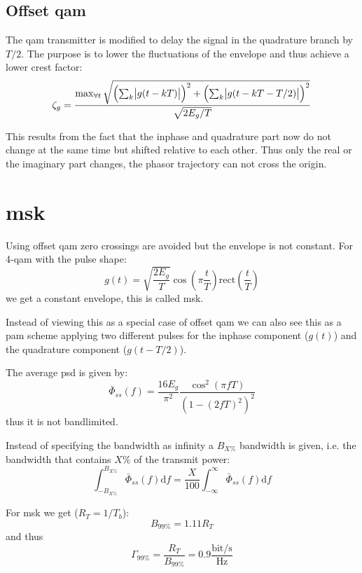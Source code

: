 \subsection{Offset \acl{qam}}
The \ac{qam} transmitter is modified to delay the signal in the quadrature branch
by $T/2$. The purpose is to lower the fluctuations of the envelope and thus achieve
a lower crest factor:
\begin{equation}
    \zeta_g = \frac{\max_{\forall t} \sqrt{{\left(\sum_k \abs{g(t-kT)}\right)}^2
        + {\left(\sum_k \abs{g(t-kT - T/2)}\right)}^2}}{\sqrt{2 E_g / T}}
\end{equation}

This results from the fact that the inphase and quadrature part now do not change
at the same time but shifted relative to each other. Thus only the real or the 
imaginary part changes, the phasor trajectory can not cross the origin.

\section{\acl{msk}}
Using offset \ac{qam} zero crossings are avoided but the envelope is not constant.
For 4-\ac{qam} with the pulse shape:
\begin{equation}
    g(t) = \sqrt{\frac{2 E_g}{T}} \cos\left(\pi \frac{t}{T}\right) 
        \text{rect}\left(\frac{t}{T}\right)
\end{equation}
we get a constant envelope, this is called \ac{msk}.

Instead of viewing this as a special case of offset \ac{qam} we can also see this as
a \ac{pam} scheme applying two different pulses for the inphase component ($g(t)$) and
the quadrature component ($g(t-T/2)$).

The average \ac{psd} is given by:
\begin{equation}
    \bar{\Phi}_{ss}(f) = \frac{16 E_g}{\pi^2} \frac{\cos^2(\pi f T)}{{(1-{(2fT)}^2)}^2}
\end{equation}
thus it is not bandlimited.

Instead of specifying the bandwidth as infinity a $B_{X\%}$ bandwidth is given,
i.e. the bandwidth that contains $X\%$ of the transmit power:
\begin{equation}
    \int_{-B_{X\%}}^{B_{X\%}} \bar{\Phi}_{ss}(f) \text{d}f =
        \frac{X}{100} \int_{-\infty}^\infty \bar{\Phi}_{ss}(f) \text{d}f
\end{equation}

For \ac{msk} we get ($R_T = 1/T_b$):
\begin{equation}
    B_{99\%} = 1.11 R_T
\end{equation}
and thus
\begin{equation}
    \Gamma_{99\%} = \frac{R_T}{B_{99\%}} = 0.9 \frac{\text{bit}/\text{s}}{\text{Hz}}
\end{equation}

